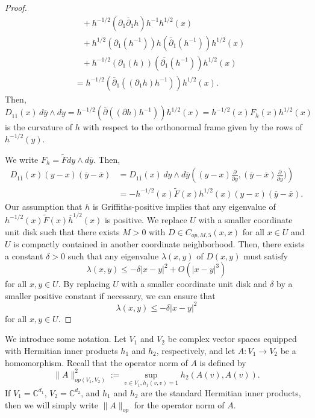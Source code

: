\documentclass{amsart}
\theoremstyle{definition}
\theoremstyle{remark}
\numberwithin{equation}{section}
\newcommand{\tanv}[1]{\frac{\partial}{\partial #1}}
\begin{document}
\begin{proof}
\begin{align*}
    & \hspace{10pt} + h^{-1/2} (\partial_1\overline{\partial}_1 h) h^{-1} h^{1/2} (x) \\
    & \hspace{10pt} + h^{1/2} (\partial_1(h^{-1}))h(\overline{\partial}_1(h^{-1}))h^{1/2}(x) \\
    & \hspace{10pt} + h^{-1/2} (\partial_1(h)) (\overline{\partial_1}(h^{-1}))h^{1/2}(x) \\
    & = h^{-1/2} (\overline{\partial}_1 ((\partial_1 h)h^{-1})) h^{1/2}(x).
\end{align*}
Then, 
$$
D_{1\overline{1}}(x) \,d\overline{y} \wedge dy = h^{-1/2} (\overline{\partial} ((\partial h)h^{-1})) h^{1/2}(x) = h^{-1/2}(x) F_{h} (x) h^{1/2}(x)
$$
is the curvature of $h$ with respect to the orthonormal frame given by the rows of $h^{-1/2}(y)$. 

We write $F_h = \tilde{F}  dy \wedge d\overline{y}$. Then,
\begin{align*}
D_{1\overline{1}}(x) (y-x)(\overline{y} - \overline{x}) & = D_{1\overline{1}}(x) \,dy \wedge d\overline{y} \left ( (y-x) \tanv{y}, (\overline{y} - \overline{x}) \tanv{\overline{y}}) \right ) \\
    & = - h^{-1/2}(x)  \tilde{F}  (x)  h^{1/2}(x) (y-x)(\overline{y}-\overline{x}).
\end{align*}
Our assumption that $h$ is Griffiths-positive implies that any eigenvalue of $h^{-1/2}(x)  \tilde{F}(x)  \overline{h}^{1/2}(x)$ is positive. We replace $U$ with a smaller coordinate unit disk such that there exists $M > 0$ with $D \in C_{op,M,5}(x,x)$ for all $x \in U$ and $U$ is compactly contained in another coordinate neighborhood. Then, there exists a constant $\delta > 0$ such that any eigenvalue $\lambda(x,y)$ of $D(x,y)$ must satisfy
$$
\lambda(x,y) \leq  -\delta|x-y|^2 + O(|x-y|^3)
$$
for all $x,y \in U$. By replacing $U$ with a smaller coordinate unit disk and $\delta$ by a smaller positive constant if necessary, we can ensure that
$$
\lambda(x,y) \leq -\delta|x-y|^2
$$
for all $x,y \in U$.
\end{proof}

We introduce some notation. Let $V_1$ and $V_2$ be complex vector spaces equipped with Hermitian inner products $h_1$ and $h_2$, respectively, and let $A : V_1 \to V_2$ be a homomorphism. Recall that the operator norm of $A$ is defined by
\begin{equation*}
\| A \|_{op(V_1,V_2)}^2 := \sup_{v \in V_1, h_1(v,v) = 1} h_2(A(v),A(v)).
\end{equation*}
If $V_1 = \mathbb{C}^{d_1}$, $V_2 = \mathbb{C}^{d_2}$, and $h_1$ and $h_2$ are the standard Hermitian inner products, then we will simply write $\|A\|_{op}$ for the operator norm of $A$.
\end{document}

